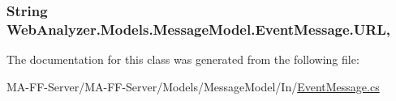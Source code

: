 \subsubsection[{U\+R\+L}]{\setlength{\rightskip}{0pt plus 5cm}String Web\+Analyzer.\+Models.\+Message\+Model.\+Event\+Message.\+U\+R\+L\hspace{0.3cm}{\ttfamily [get]}, {\ttfamily [set]}}\label{class_web_analyzer_1_1_models_1_1_message_model_1_1_event_message_a29a86382ec9c22a11920131a9b1ab644}


The documentation for this class was generated from the following file\+:\begin{DoxyCompactItemize}
\item 
M\+A-\/\+F\+F-\/\+Server/\+M\+A-\/\+F\+F-\/\+Server/\+Models/\+Message\+Model/\+In/\hyperlink{_event_message_8cs}{Event\+Message.\+cs}\end{DoxyCompactItemize}
